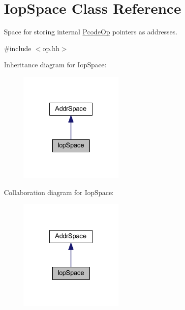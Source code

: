 \hypertarget{class_iop_space}{}\section{Iop\+Space Class Reference}
\label{class_iop_space}


Space for storing internal \mbox{\hyperlink{class_pcode_op}{Pcode\+Op}} pointers as addresses.  




{\ttfamily \#include $<$op.\+hh$>$}



Inheritance diagram for Iop\+Space\+:
\nopagebreak
\begin{figure}[H]
\begin{center}
\leavevmode
\includegraphics[width=145pt]{class_iop_space__inherit__graph}
\end{center}
\end{figure}


Collaboration diagram for Iop\+Space\+:
\nopagebreak
\begin{figure}[H]
\begin{center}
\leavevmode
\includegraphics[width=145pt]{class_iop_space__coll__graph}
\end{center}
\end{figure}
